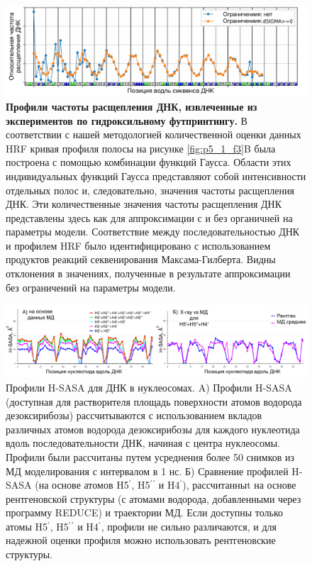     
\begin{figure} [H]
    \centering
    \includegraphics[width=\textwidth]{images/p5/part5_1_np/p5_1_f4.pdf}
    \caption[Профили частоты расщепления ДНК, извлеченные из экспериментов по гидроксильному футпринтингу.]{\textbf{Профили частоты расщепления ДНК, извлеченные из экспериментов по гидроксильному футпринтингу.} В соответствии с нашей методологией количественной оценки данных HRF кривая профиля полосы на рисунке \ref{fig:p5_1_f3}B была построена с помощью комбинации функций Гаусса. Области этих индивидуальных функций Гаусса представляют собой интенсивности отдельных полос и, следовательно, значения частоты расщепления ДНК. Эти количественные значения частоты расщепления ДНК представлены здесь как для аппроксимации с и без органичней на параметры модели. Соответствие между последовательностью ДНК и профилем HRF было идентифицировано с использованием продуктов реакций секвенирования Максама-Гилберта. Видны отклонения в значениях, полученные в результате аппроксимации без ограничений на параметры модели.}
    \label{fig:p5_1_f4}
\end{figure}
    
\begin{figure} [H]
    \centering
    \includegraphics[width=\textwidth]{images/p5/part5_1_np/p5_1_f5.pdf}
    \caption[Профили H-SASA для ДНК в нуклеосомах]{Профили H-SASA для ДНК в нуклеосомах. A) Профили H-SASA (доступная для растворителя площадь поверхности атомов водорода дезоксирибозы) рассчитываются с использованием вкладов различных атомов водорода дезоксирибозы для каждого нуклеотида вдоль последовательности ДНК, начиная с центра нуклеосомы. Профили были рассчитаны путем усреднения более 50 снимков из МД моделирования с интервалом в 1 нс. Б) Сравнение профилей H-SASA (на основе атомов H5$^\prime$, H5$^\prime$$^\prime$ и H4$^\prime$), рассчитанныt на основе рентгеновской структуры (с атомами водорода, добавленными через программу REDUCE) и траектории МД. Если доступны только атомы H5$^\prime$, H5$^\prime$$^\prime$ и H4$^\prime$, профили не сильно различаются, и для надежной оценки профиля можно использовать рентгеновские структуры.}
    \label{fig:p5_1_f5}
\end{figure}
    
